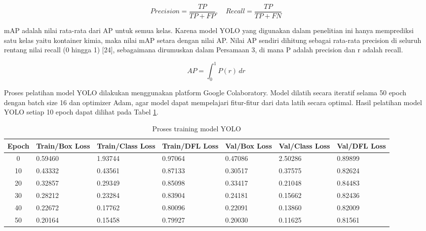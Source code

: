 \begin{equation}
  Precision = \frac{TP}{TP + FP}, \quad
  Recall = \frac{TP}{TP + FN}
\end{equation}

mAP adalah nilai rata-rata dari AP untuk semua kelas. Karena model
YOLO yang digunakan dalam penelitian ini hanya
memprediksi satu kelas yaitu kontainer kimia, maka nilai mAP setara
dengan nilai AP. Nilai AP sendiri dihitung sebagai rata-rata
precision di seluruh
rentang nilai recall (0 hingga 1) [24], sebagaimana dirumuskan dalam
Persamaan 3, di mana P adalah precision dan r adalah recall.

\begin{equation}
  AP = \int_{0}^{1} P(r) \,dr
\end{equation}

Proses pelatihan model YOLO dilakukan menggunakan platform Google
Colaboratory. Model dilatih secara iteratif selama 50 epoch dengan
batch size 16 dan optimizer Adam, agar model dapat mempelajari
fitur-fitur dari data latih secara optimal. Hasil pelatihan model
YOLO setiap 10 epoch dapat dilihat pada Tabel \ref{tab:yolo-train}.

\begin{table}[H]
  \caption{Proses training model YOLO}
  \label{tab:yolo-train}
  \vspace{-1em}
  \centering
  \footnotesize
  \begin{tabular}{c p{1.5cm} p{1.5cm} p{1.5cm} p{1.5cm} p{1.5cm} p{1.5cm}}
    \toprule
    \textbf{Epoch} & \textbf{Train/Box Loss} & \textbf{Train/Class Loss}
    & \textbf{Train/DFL Loss} & \textbf{Val/Box Loss}
    & \textbf{Val/Class Loss} & \textbf{Val/DFL Loss} \\
    \midrule
    0 & 0.59460 & 1.93744 & 0.97064 & 0.47086 & 2.50286 & 0.89899 \\
    10 & 0.43332 & 0.43561 & 0.87133 & 0.30517 & 0.37575 & 0.82624 \\
    20 & 0.32857 & 0.29349 & 0.85098 & 0.33417 & 0.21048 & 0.84483 \\
    30 & 0.28212 & 0.23284 & 0.83904 & 0.24181 & 0.15662 & 0.82436 \\
    40 & 0.22672 & 0.17762 & 0.80096 & 0.22091 & 0.13860 & 0.82009 \\
    50 & 0.20164 & 0.15458 & 0.79927 & 0.20030 & 0.11625 & 0.81561 \\
    \bottomrule
  \end{tabular}
  \normalsize
\end{table}

